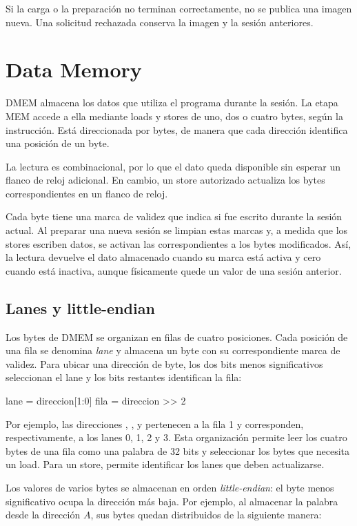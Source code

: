 Si la carga o la preparación no terminan correctamente, no se publica una
imagen nueva. Una solicitud  rechazada conserva la imagen y la
sesión anteriores.

\section{Data Memory}

DMEM almacena los datos que utiliza el programa durante la sesión. La etapa MEM
accede a ella mediante loads y stores de uno, dos o cuatro bytes, según la
instrucción. Está direccionada por bytes, de manera que cada dirección
identifica una posición de un byte.

La lectura es combinacional, por lo que el dato queda disponible sin esperar
un flanco de reloj adicional. En cambio, un store autorizado actualiza los
bytes correspondientes en un flanco de reloj.

Cada byte tiene una marca de validez que indica si fue escrito durante la
sesión actual. Al preparar una nueva sesión se limpian estas marcas y, a medida
que los stores escriben datos, se activan las correspondientes a los bytes
modificados. Así, la lectura devuelve el dato almacenado cuando su marca está
activa y cero cuando está inactiva, aunque físicamente quede un valor de una
sesión anterior.

\subsection{Lanes y little-endian}

Los bytes de DMEM se organizan en filas de cuatro posiciones. Cada posición de
una fila se denomina \emph{lane} y almacena un byte con su correspondiente
marca de validez. Para ubicar una dirección de byte, los dos bits menos
significativos seleccionan el lane y los bits restantes identifican la fila:

\begin{codebox}
lane = direccion[1:0]
fila = direccion >> 2
\end{codebox}

Por ejemplo, las direcciones , ,  y
 pertenecen a la fila 1 y corresponden, respectivamente, a los
lanes 0, 1, 2 y 3. Esta organización permite leer los cuatro bytes de una fila
como una palabra de 32 bits y seleccionar los bytes que necesita un load. Para
un store, permite identificar los lanes que deben actualizarse.

Los valores de varios bytes se almacenan en orden \emph{little-endian}: el
byte menos significativo ocupa la dirección más baja. Por ejemplo, al
almacenar la palabra  desde la dirección $A$, sus bytes
quedan distribuidos de la siguiente manera:

